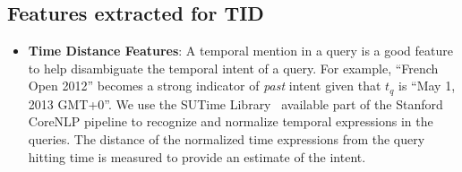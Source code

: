\documentclass{sig-alternate}
\begin{document}
\subsection{Features extracted for TID}\label{sec:tid features}
\begin{itemize}
\item\textbf{Time Distance Features}: A temporal mention in a query is a good feature to help disambiguate the temporal intent of a query. For example, ``French Open 2012'' becomes a strong indicator of \textit{past} intent given that $t_{q}$ is ``May 1, 2013 GMT+0''. We use the SUTime Library~\cite{sutime} available part of the Stanford CoreNLP pipeline to recognize and normalize temporal expressions in the queries.
The distance of the normalized time expressions from the query hitting time is measured to provide an estimate of the intent.


\end{itemize}
\end{document}

